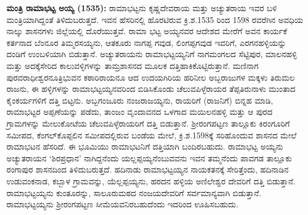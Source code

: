 \textbf{ಮಂತ್ರಿ ರಾಮಾಭಟ್ಟ ಅಯ್ಯ (1535):} ರಾಮಾಭಟ್ಟನು ಕೃಷ್ಣದೇವರಾಯ ಮತ್ತು ಅಚ್ಯುತರಾಯ ಇವರ ಬಳಿ ಮಂತ್ರಿಯಾಗಿದ್ದಂತೆ ತಿಳಿದುಬರುತ್ತದೆ. ಇವನ ಹೆಸರಿನಲ್ಲಿ ಹೊರಟಿರುವ ಕ್ರಿ.ಶ.1535 ರಿಂದ 1598 ರವರೆಗಿನ ಅವಧಿಯ ನಾಲ್ಕು ಶಾಸನಗಳು ಜಿಲ್ಲೆಯಲ್ಲಿ ದೊರೆಯುತ್ತವೆ. ರಾಮಾ ಭಟ್ಟ ಅಯ್ಯನವರ ಆದೇಶದ ಮೇರೆಗೆ ಅವನ ಕಾರ್ಯಕೆ ಕರ್ತನಾದ ಬೆಂನೂರ ತಿಮ್ಮರಸಯ್ಯನು, ಆತಕೂರು ನಾಗಪ್ಪ ಗವುಡ, ಲಿಂಗಪ್ಪಗವುಡ ಇವರಿಗೆ, ಎರಗನಹಳ್ಳಿಯನ್ನು ದಂಡಿಗೆ ಉಂಬಳಿ\-ಯಾಗಿ ಬಿಡುತ್ತಾನೆ. ಅಚ್ಯುತರಾಯನು ರಾಮಾಭಟ್ಟಯ್ಯನಿಗೆ ನಾಗಮಂಗಲದ ಸೆಟ್ಟಿಪುರ, ಮಾಲನಹಳ್ಳಿ ಮತ್ತು ಅದಕ್ಕೆ\break ಸೇರಿದ ಕಾಲುವಳ್ಳಿಗಳನ್ನು ತಾಮ್ರಶಾಸನದ ಮೂಲಕ ದತ್ತಿಹಾಕಿಕೊಟ್ಟಿರುತ್ತಾನೆ. ಮಣಿನಾಗ ಪುರವರಾಧೀಶ್ವರನೂ\break ತ್ರಿಭುವನ ಕಠಾರಿರಾಯನೂ ಆದ ಉದಯಗಿರಿಯ ಹರಿನೀಲ ಅಬ್ಬರಾಜುಗಳ ಮಕ್ಕಳು ತಿರುಮಲ ರಾಜನು, ಈ ಹಳ್ಳಿಗಳನ್ನು ರಾಮಾಭಟ್ಟಯ್ಯನವರಿಂದ ಬಿಡಿಸಿಕೊಂಡು ಚೆಲುವಪಿಳ್ಳೆರಾಯರ ತೆಪ್ಪತಿರುನಾಳು ಮುಂತಾದ ಕೈಂಕರ್ಯಗಳಿಗೆ ದತ್ತಿ ಬಿಟ್ಟನು. ಅಬ್ಬಗಂಜೂರು ನಂಜರಾಜಯ್ಯನು, ರಾಯರಿಗೆ (ರಾಜನಿಗೆ) ಬಿನ್ನಹ ಮಾಡಿ, ರಾಮಾಭಟ್ಟರ ಅಪ್ಪಣೆಯನ್ನು ಪಡೆದು, ತಾಂಜಂ ವೃಂದಾವನದ ಒಳಗಾದ ಮಯಿಲನಹಳ್ಳಿ ಮತ್ತು ಆ ಪುರದ ಗ್ರಾಮಗಳನ್ನು ಮೇಲುಕೋಟೆಯ ಚೆಲುವಪಿಳ್ಳೆರಾಯರಿಗೆ ದತ್ತಿ ಬಿಡುತ್ತಾನೆ. ಶ‍್ರೀರಂಗಪಟ್ಟಣ ತಾಲ್ಲೂಕು ಕಿರಂಗೂರಿಗೆ ಸಮೀಪದ, ಕೆಂಗಲ್​ಕೊಪ್ಪಲಿನ ಸಮೀಪದಲ್ಲಿರುವ ಬಂಡೆಯ ಮೇಲೆ, ಕ್ರಿ.ಶ.1598ಕ್ಕೆ ಸರಿಹೊಂದುವ ಶಾಸನದ ಮೇಲೆ ರಾಮಾಭಟನ ಹೆಸರಿದೆ. ಈ ಭೂಮಿಯು ರಾಮಾಭಟನಿಗೆ ದತ್ತಿಯಾಗಿ ಬಂದಿರಬಹುದು. ರಾಮಾಭಟ್ಟ ಅಯ್ಯನು ಅಚ್ಯುತರಾಯನ ‘ಶಿರಪ್ರಧಾನ’ ನಾಗಿದ್ದನೆಂದು ಯಲ್ಲಪ್ಪಯ್ಯನೆಂಬುವವನು ಇವನ ತಮ್ಮನೆಂದು ಪಾವಗಡ ತಾಲ್ಲೂಕು ರಂಗಾಪುರ ಶಾಸನದಿಂದ ತಿಳಿದುಬರುತ್ತದೆ. ಹದಿನಾಡು ರಾಮಾಭಟ್ಟಯ್ಯನ ನಾಯಕತನಕ್ಕೆ ಸೇರಿತ್ತೆಂದು, ಹದಿನಾಡಿನ ಉಡುವಂಕನಾಡ, ಕಬ್ಬಾಳ ಗ್ರಾಮವನ್ನು, ಯೆಲ್ಲಪ್ಪಯ್ಯನು, ಹರದನ ಹಳ್ಳಿಯ ಅಣಿಲೇಶ್ವರ ದೇವರಿಗೆ ದತ್ತಿ ಬಿಡುತ್ತಾನೆ. ರಾಮಾಭಟ್ಟಯ್ಯನು ಕುಂತೂರನ್ನು, ಸಾಲೂರುಮಠದ ನಂಜಯದೇವರಿಗೆ ಸರ್ವಮಾನ್ಯವಾಗಿ ಬಿಡುತ್ತಾನೆ. ರಾಮಾಭಟ್ಟಯ್ಯನು ಶ‍್ರೀರಂಗಪಟ್ಟಣ ಸೀಮೆಯವನಿರಬಹುದೆಂದು ಇದರಿಂದ ಊಹಿಸಬಹುದು.

